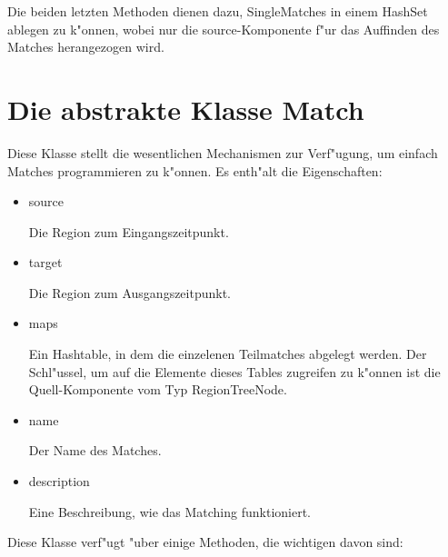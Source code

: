 Die beiden letzten Methoden dienen dazu, SingleMatches in einem HashSet ablegen zu k"onnen, wobei nur die source-Komponente f"ur das Auffinden des Matches herangezogen wird.

\section{Die abstrakte Klasse Match}
Diese Klasse stellt die wesentlichen Mechanismen zur Verf"ugung, um einfach Matches programmieren zu k"onnen. Es enth"alt die Eigenschaften:
\begin{itemize}
\item source

Die Region zum Eingangszeitpunkt.

\item target

Die Region zum Ausgangszeitpunkt.

\item maps

Ein Hashtable, in dem die einzelenen Teilmatches abgelegt werden. Der Schl"ussel, um auf die Elemente dieses Tables zugreifen zu k"onnen ist die Quell-Komponente vom Typ RegionTreeNode.

\item name

Der Name des Matches.

\item description

Eine Beschreibung, wie das Matching funktioniert.
\end{itemize} 

Diese Klasse verf"ugt "uber einige Methoden, die wichtigen davon  sind:

